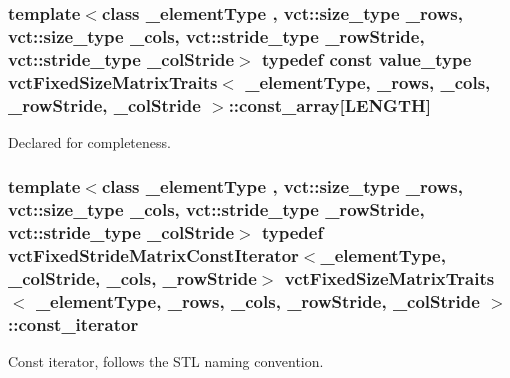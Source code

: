 \subsubsection[{const\+\_\+array}]{\setlength{\rightskip}{0pt plus 5cm}template$<$class \+\_\+element\+Type , vct\+::size\+\_\+type \+\_\+rows, vct\+::size\+\_\+type \+\_\+cols, vct\+::stride\+\_\+type \+\_\+row\+Stride, vct\+::stride\+\_\+type \+\_\+col\+Stride$>$ typedef const value\+\_\+type {\bf vct\+Fixed\+Size\+Matrix\+Traits}$<$ \+\_\+element\+Type, \+\_\+rows, \+\_\+cols, \+\_\+row\+Stride, \+\_\+col\+Stride $>$\+::const\+\_\+array\mbox{[}{\bf L\+E\+N\+G\+T\+H}\mbox{]}}\label{classvct_fixed_size_matrix_traits_ac7459b07165b6f472e2f5238cc069b55}
Declared for completeness. \hypertarget{classvct_fixed_size_matrix_traits_a8f7178fb03f45772c705fba16e08065d}{}
\subsubsection[{const\+\_\+iterator}]{\setlength{\rightskip}{0pt plus 5cm}template$<$class \+\_\+element\+Type , vct\+::size\+\_\+type \+\_\+rows, vct\+::size\+\_\+type \+\_\+cols, vct\+::stride\+\_\+type \+\_\+row\+Stride, vct\+::stride\+\_\+type \+\_\+col\+Stride$>$ typedef {\bf vct\+Fixed\+Stride\+Matrix\+Const\+Iterator}$<$\+\_\+element\+Type, \+\_\+col\+Stride, \+\_\+cols, \+\_\+row\+Stride$>$ {\bf vct\+Fixed\+Size\+Matrix\+Traits}$<$ \+\_\+element\+Type, \+\_\+rows, \+\_\+cols, \+\_\+row\+Stride, \+\_\+col\+Stride $>$\+::{\bf const\+\_\+iterator}}\label{classvct_fixed_size_matrix_traits_a8f7178fb03f45772c705fba16e08065d}
Const iterator, follows the S\+T\+L naming convention. \hypertarget{classvct_fixed_size_matrix_traits_a362cff0931f811552609307e80af3eab}{}
